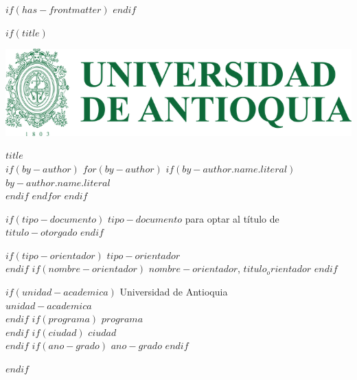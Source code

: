 $if(has-frontmatter)$
\frontmatter
$endif$

$if(title)$
\cleardoublepage
\thispagestyle{empty}

{\centering

\includegraphics{assets/escudo_udea.png}

\vspace{2cm}
{\bfseries $title$}\\[2cm]

\vspace{2cm}
$if(by-author)$
$for(by-author)$
$if(by-author.name.literal)$
{$by-author.name.literal$}\\
$endif$
$endfor$
$endif$

\vspace{2cm}
$if(tipo-documento)$
{$tipo-documento$ para optar al título de $titulo-otorgado$}
$endif$

\vspace{2cm}
$if(tipo-orientador)$
{$tipo-orientador$}\\
$endif$
$if(nombre-orientador)$
{$nombre-orientador$, $titulo_orientador$}
$endif$

\vspace{2cm}
$if(unidad-academica)$
{Universidad de Antioquia}\\
{$unidad-academica$}\\
$endif$
$if(programa)$
{$programa$}\\
$endif$
$if(ciudad)$
{$ciudad$}\\
$endif$
$if(ano-grado)$
{$ano-grado$}
$endif$

}

$endif$
\newpage


